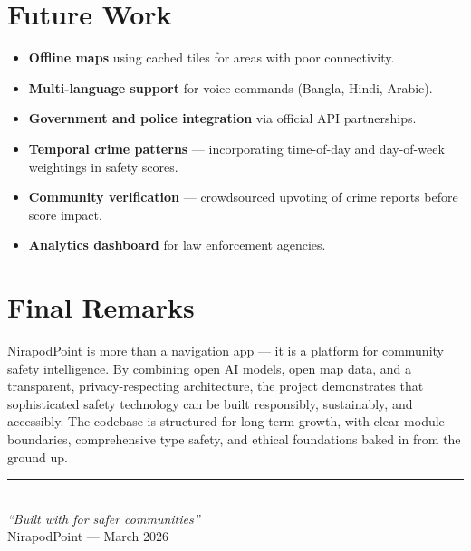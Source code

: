 \documentclass[12pt,a4paper]{report}
\begin{document}
\section{Future Work}
\begin{itemize}[leftmargin=*]
    \item \textbf{Offline maps} using cached tiles for areas with poor connectivity.
    \item \textbf{Multi-language support} for voice commands (Bangla, Hindi, Arabic).
    \item \textbf{Government and police integration} via official API partnerships.
    \item \textbf{Temporal crime patterns} — incorporating time-of-day and day-of-week weightings in safety scores.
    \item \textbf{Community verification} — crowdsourced upvoting of crime reports before score impact.
    \item \textbf{Analytics dashboard} for law enforcement agencies.
\end{itemize}

\section{Final Remarks}
NirapodPoint is more than a navigation app — it is a platform for community safety intelligence. By combining open AI models, open map data, and a transparent, privacy-respecting architecture, the project demonstrates that sophisticated safety technology can be built responsibly, sustainably, and accessibly. The codebase is structured for long-term growth, with clear module boundaries, comprehensive type safety, and ethical foundations baked in from the ground up.

\vspace{1cm}
\begin{center}
    \rule{0.5\textwidth}{0.4pt}\\[0.3cm]
    \textit{``Built with \heartsuit{} for safer communities''}\\[0.2cm]
    NirapodPoint --- March 2026
\end{center}
\end{document}
